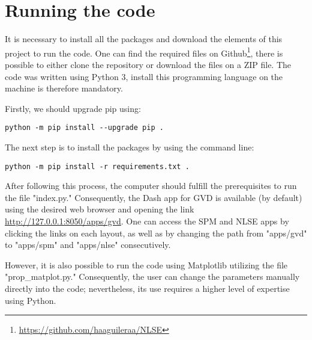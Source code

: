 \section{Running the code}
\label{sec:initvariables}
It is necessary to install all the packages and download the elements of this project to run the code. One can find the required files on Github\footnote{\url{https://github.com/haaguileraa/NLSE}}, there is possible to either clone the repository or download the files on a ZIP file. The code was written using Python 3, install this programming language on the machine is therefore mandatory. 

Firstly, we should upgrade pip using:
\ \\

\begin{lstlisting}
python -m pip install --upgrade pip .
\end{lstlisting}

The next step is to install the packages by using the command line:
\ \\

\begin{lstlisting}
python -m pip install -r requirements.txt . 
\end{lstlisting}


After following this process, the computer should fulfill the prerequisites to run the file "index.py." Consequently, the Dash app for GVD is available (by default) using the desired web browser and opening the link \url{http://127.0.0.1:8050/apps/gvd}. One can access the SPM and NLSE apps by clicking the links on each layout, as well as by changing the path from "apps/gvd" to "apps/spm" and "apps/nlse" consecutively.

However, it is also possible to run the code using Matplotlib utilizing the file "prop\_matplot.py." Consequently, the user can change the parameters manually directly into the code; nevertheless, its use requires a higher level of expertise using Python.

